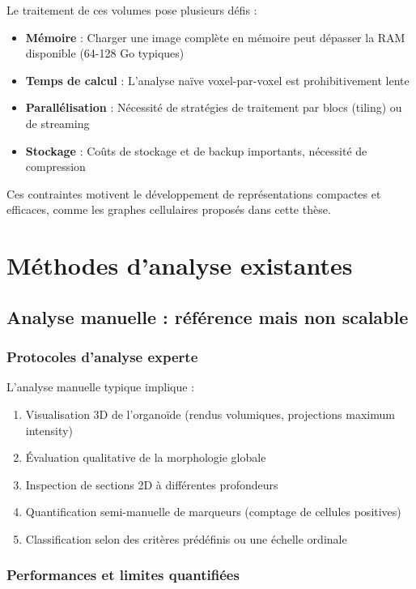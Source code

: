 Le traitement de ces volumes pose plusieurs défis :
\begin{itemize}
    \item \textbf{Mémoire} : Charger une image complète en mémoire peut dépasser la RAM disponible (64-128 Go typiques)
    \item \textbf{Temps de calcul} : L'analyse naïve voxel-par-voxel est prohibitivement lente
    \item \textbf{Parallélisation} : Nécessité de stratégies de traitement par blocs (tiling) ou de streaming
    \item \textbf{Stockage} : Coûts de stockage et de backup importants, nécessité de compression
\end{itemize}

Ces contraintes motivent le développement de représentations compactes et efficaces, comme les graphes cellulaires proposés dans cette thèse.

\section{Méthodes d'analyse existantes}

\subsection{Analyse manuelle : référence mais non scalable}

\subsubsection{Protocoles d'analyse experte}

L'analyse manuelle typique implique :
\begin{enumerate}
    \item Visualisation 3D de l'organoïde (rendus volumiques, projections maximum intensity)
    \item Évaluation qualitative de la morphologie globale
    \item Inspection de sections 2D à différentes profondeurs
    \item Quantification semi-manuelle de marqueurs (comptage de cellules positives)
    \item Classification selon des critères prédéfinis ou une échelle ordinale
\end{enumerate}

\subsubsection{Performances et limites quantifiées}

